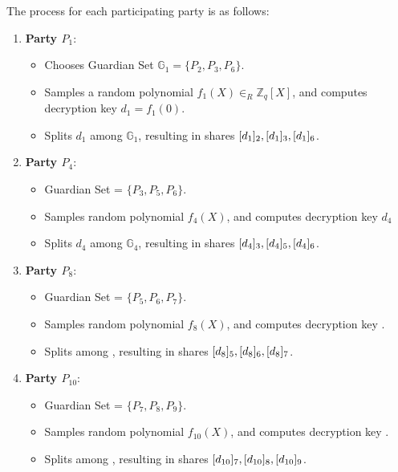 \documentclass{article}
\begin{document}
The process for each participating party is as follows:

\begin{enumerate}
    \item \textbf{Party $P_1$}:
    \begin{itemize}
        \item Chooses Guardian Set $\mathbb{G}_1 = \{P_2, P_3, P_6\}$.
        \item Samples a random polynomial $f_1(X) \in_R \mathbb{Z}_q[X]$, and computes decryption key $d_1 = f_1(0)$.
        \item Splits $d_1$ among $\mathbb{G}_1$, resulting in shares $[d_{1}]_{2}, [d_{1}]_{3}, [d_{1}]_{6}$.
    \end{itemize}

    \item \textbf{Party $P_4$}:
    \begin{itemize}
        \item Guardian Set  = $\{P_3, P_5, P_6\}$.
        \item Samples random polynomial $f_4(X)$, and computes decryption key $d_4$
        \item Splits $d_4$ among $\mathbb{G}_4$, resulting in shares $[d_{4}]_{3}, [d_{4}]_{5}, [d_{4}]_{6}$.
    \end{itemize}

    \item \textbf{Party $P_8$}:
    \begin{itemize}
        \item Guardian Set  = $\{P_5, P_6, P_7\}$.
        \item Samples random polynomial $f_8(X)$, and computes decryption key .
        \item Splits  among , resulting in shares $[d_{8}]_{5}, [d_{8}]_{6}, [d_{8}]_{7}$.
    \end{itemize}

    \item \textbf{Party $P_{10}$}:
    \begin{itemize}
        \item Guardian Set  = $\{P_7, P_8, P_9\}$.
        \item Samples random polynomial $f_{10}(X)$, and computes decryption key .
        \item Splits  among , resulting in shares $[d_{10}]_{7}, [d_{10}]_{8}, [d_{10}]_{9}$.
        
    \end{itemize}
\end{enumerate}
\end{document}
